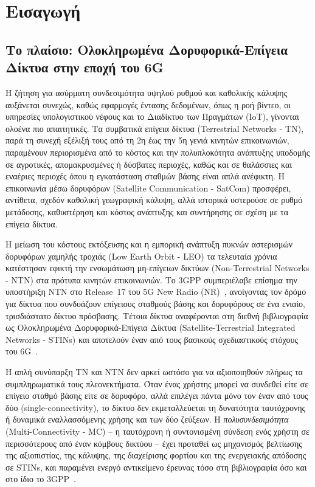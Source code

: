 \chapter{Εισαγωγή}
\label{ch:introduction}

\section{Το πλαίσιο: Ολοκληρωμένα Δορυφορικά-Επίγεια Δίκτυα στην εποχή του 6G}
\label{sec:intro-context}

Η ζήτηση για ασύρματη συνδεσιμότητα υψηλού ρυθμού και καθολικής κάλυψης
αυξάνεται συνεχώς, καθώς εφαρμογές έντασης δεδομένων, όπως η ροή βίντεο,
οι υπηρεσίες υπολογιστικού νέφους και το Διαδίκτυο των Πραγμάτων (IoT),
γίνονται ολοένα πιο απαιτητικές. Τα συμβατικά επίγεια δίκτυα
(Terrestrial Networks - TN), παρά τη συνεχή εξέλιξή τους από τη 2η έως
την 5η γενιά κινητών επικοινωνιών, παραμένουν περιορισμένα από το κόστος
και την πολυπλοκότητα ανάπτυξης υποδομής σε αγροτικές, απομακρυσμένες ή
δύσβατες περιοχές, καθώς και σε θαλάσσιες και εναέριες περιοχές όπου η
εγκατάσταση σταθμών βάσης είναι απλά ανέφικτη. Η επικοινωνία μέσω
δορυφόρων (Satellite Communication - SatCom) προσφέρει, αντίθετα, σχεδόν
καθολική γεωγραφική κάλυψη, αλλά ιστορικά υστερούσε σε ρυθμό μετάδοσης,
καθυστέρηση και κόστος ανάπτυξης και συντήρησης σε σχέση με τα επίγεια
δίκτυα.

Η μείωση του κόστους εκτόξευσης και η εμπορική ανάπτυξη πυκνών
αστερισμών δορυφόρων χαμηλής τροχιάς (Low Earth Orbit - LEO) τα
τελευταία χρόνια κατέστησαν εφικτή την ενσωμάτωση μη-επίγειων δικτύων
(Non-Terrestrial Networks - NTN) στα πρότυπα κινητών επικοινωνιών. Το
3GPP συμπεριέλαβε επίσημα την υποστήριξη NTN στο Release~17 του 5G New
Radio (NR)~\cite{tr38821}, ανοίγοντας τον δρόμο για δίκτυα που
συνδυάζουν επίγειους σταθμούς βάσης και δορυφόρους σε ένα ενιαίο,
τρισδιάστατο δίκτυο πρόσβασης. Τέτοια δίκτυα αναφέρονται στη διεθνή
βιβλιογραφία ως Ολοκληρωμένα Δορυφορικά-Επίγεια Δίκτυα
(Satellite-Terrestrial Integrated Networks - STINs) και αποτελούν έναν
από τους βασικούς σχεδιαστικούς στόχους του 6G~\cite{li2025advancing,
noh2024tnntn}.

Η απλή συνύπαρξη TN και NTN δεν αρκεί ωστόσο για να αξιοποιηθούν πλήρως
τα συμπληρωματικά τους πλεονεκτήματα. Όταν ένας χρήστης μπορεί να
συνδεθεί είτε σε επίγειο σταθμό βάσης είτε σε δορυφόρο, αλλά επιλέγει
πάντα μόνο τον έναν από τους δύο (single-connectivity), το δίκτυο δεν
εκμεταλλεύεται τη δυνατότητα ταυτόχρονης ή δυναμικά εναλλασσόμενης
χρήσης και των δύο ζεύξεων. Η \emph{πολυσυνδεσιμότητα} (Multi-Connectivity
- MC) -- η ταυτόχρονη ή συντονισμένη σύνδεση ενός χρήστη σε περισσότερους
από έναν κόμβους δικτύου -- έχει προταθεί ως μηχανισμός βελτίωσης της
αξιοπιστίας, της κάλυψης, της διαχείρισης φορτίου και της ενεργειακής
απόδοσης σε STINs, και παραμένει ενεργό αντικείμενο έρευνας τόσο στη
βιβλιογραφία όσο και στο ίδιο το 3GPP~\cite{majamaa2024toward,
pupiales2021multiconnectivity, shang2024multiconnectivity}.


